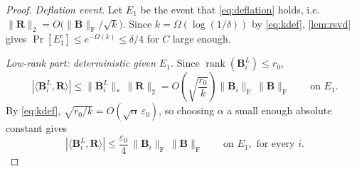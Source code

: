 \documentclass{article}
\renewcommand{\vec}[1]{\mathbf{#1}}          %
\newcommand{\F}{\mathrm{F}}                  %
\newcommand{\eps}{\varepsilon}
\newcommand{\inner}[2]{\langle #1, #2 \rangle}
\DeclareMathOperator{\rank}{rank}
\theoremstyle{remark}
\begin{document}
\begin{proof}
\emph{Deflation event.}
Let $E_1$ be the event that \cref{eq:deflation} holds, i.e.\ $\|\vec{R}\|_2 = O\bigl( \|\vec{B}\|_\F/\sqrt{k} \bigr)$.
Since $k = \Omega(\log(1/\delta))$ by \cref{eq:kdef}, \cref{lem:rsvd} gives $\Pr[E_1^c] \le e^{-\Omega(k)} \le \delta/4$ for $C$ large enough.

\emph{Low-rank part: deterministic given $E_1$.}
Since $\rank(\vec{B}_i^L) \le r_0$,
\[
|\inner{\vec{B}_i^L}{\vec{R}}|
\le \|\vec{B}_i^L\|_* \, \|\vec{R}\|_2
= O\!\left( \sqrt{\frac{r_0}{k}} \right) \|\vec{B}_i\|_\F \, \|\vec{B}\|_\F
\qquad\text{on } E_1 .
\]
By \cref{eq:kdef}, $\sqrt{r_0/k} = O(\sqrt{\alpha}\,\eps_0)$, so choosing $\alpha$ a small enough absolute constant gives
\begin{equation}\label{eq:lowrank}
|\inner{\vec{B}_i^L}{\vec{R}}| \le \frac{\eps_0}{4} \, \|\vec{B}_i\|_\F \, \|\vec{B}\|_\F
\qquad\text{on } E_1, \text{ for every } i .
\end{equation}


\end{proof}
\end{document}
